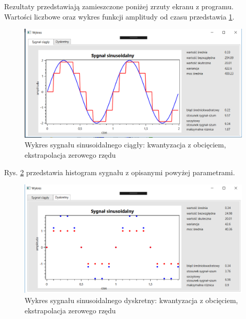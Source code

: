 \documentclass[12pt]{article}
\begin{document}
Rezultaty przedstawiają zamieszczone poniżej zrzuty ekranu z programu. Wartości liczbowe oraz wykres funkcji amplitudy od czasu przedstawia \ref{Wykres dla wyników eksperymentu trzeciego}.
\begin{figure}[h!]
 \centering
 \includegraphics[width=12.3cm]{SinKwantZaokrEkstA2T2f10H2t1C.PNG}
 \vspace{-0.3cm}
 \caption{Wykres sygnału sinusoidalnego ciągły: kwantyzacja z obcięciem, ekstrapolacja zerowego rzędu}
 \label{Wykres dla wyników eksperymentu trzeciego}
\end{figure}

\newpage
Rys. \ref{Histogram dla wyników eksperymentu trzeciego} przedstawia histogram sygnału z opisanymi powyżej parametrami. 
\begin{figure}[h!]
 \centering
 \includegraphics[width=12.3cm]{SinKwantObcrEkstA2T2f10H2t1D.PNG}
 \vspace{-0.3cm}
 \caption{Wykres sygnału sinusoidalnego dyskretny: kwantyzacja z obcięciem, ekstrapolacja zerowego rzędu}
 \label{Histogram dla wyników eksperymentu trzeciego}
\end{figure}

\end{document}

